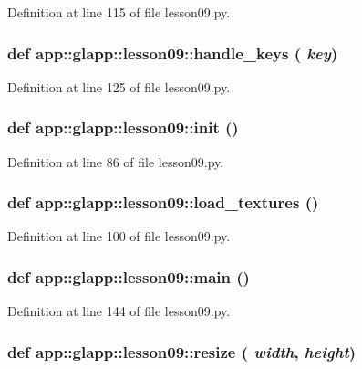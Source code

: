 Definition at line 115 of file lesson09.py.
\subsubsection{\setlength{\rightskip}{0pt plus 5cm}def app::glapp::lesson09::handle\_\-keys ( {\em key})}\label{namespaceapp_1_1glapp_1_1lesson09_ca6df79ce754fa1cd1eeccdf9214ff36}




Definition at line 125 of file lesson09.py.
\subsubsection{\setlength{\rightskip}{0pt plus 5cm}def app::glapp::lesson09::init ()}\label{namespaceapp_1_1glapp_1_1lesson09_3395201f883eb3b547bd2791cb072a29}




Definition at line 86 of file lesson09.py.
\subsubsection{\setlength{\rightskip}{0pt plus 5cm}def app::glapp::lesson09::load\_\-textures ()}\label{namespaceapp_1_1glapp_1_1lesson09_46de412ef3b4621af6ad0d70a76a75ce}




Definition at line 100 of file lesson09.py.
\subsubsection{\setlength{\rightskip}{0pt plus 5cm}def app::glapp::lesson09::main ()}\label{namespaceapp_1_1glapp_1_1lesson09_4fcea120e5dca59e96ad5286f1848893}




Definition at line 144 of file lesson09.py.
\subsubsection{\setlength{\rightskip}{0pt plus 5cm}def app::glapp::lesson09::resize ( {\em width},  {\em height})}\label{namespaceapp_1_1glapp_1_1lesson09_7e14dec8f128aadfbaec4500ef62ca21}




